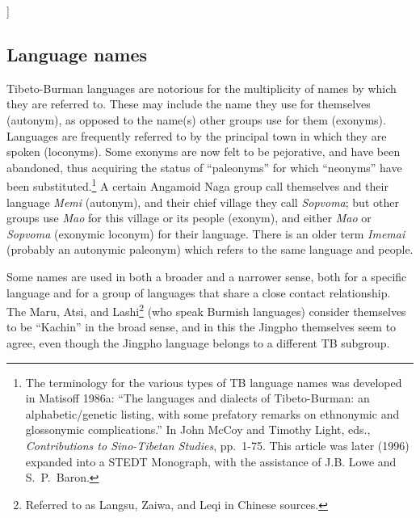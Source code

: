 \begin{itemize}
[[INSERT JAM PROSE]]

\subsection{Language names}


Tibeto-Burman languages are notorious for the multiplicity of names by which
they are referred to. These may include the name they use for themselves
(autonym), as opposed to the name(s) other groups use for them (exonyms). 
Languages are frequently referred to by the principal town in which they are
spoken (loconyms).  Some exonyms are now felt to be pejorative, and have been
abandoned, thus acquiring the status of “paleonyms” for which “neonyms” have
been substituted.\footnote{The terminology for the various types of TB language
names was developed in Matisoff 1986a: “The languages and dialects of
Tibeto-Burman: an alphabetic/genetic listing, with some prefatory remarks on
ethnonymic and glossonymic complications.”  In John McCoy and Timothy Light,
eds., \textit{Contributions to Sino-Tibetan Studies},  pp.~1-75.  This article was later
(1996) expanded into a STEDT Monograph, with the assistance of J.B. Lowe and
S.\ P.\ Baron.}  A certain Angamoid Naga group call themselves and their language
\textit{Memi} (autonym), and their chief village they call \textit{Sopvoma};
but other groups use
\textit{Mao} for this village or its people (exonym), and either \textit{Mao}
or \textit{Sopvoma} (exonymic
loconym) for their language.  There is an older term \textit{Imemai} (probably an
autonymic paleonym) which refers to the same language and people.


Some names are used in both a broader and a narrower sense, both for a
specific language and for a group of languages that share a close contact
relationship.  The Maru, Atsi, and Lashi\footnote{Referred to as Langsu, Zaiwa,
and Leqi in Chinese sources.} (who speak Burmish languages) consider themselves
to be “Kachin” in the broad sense, and in this the Jingpho themselves seem to
agree, even though the Jingpho language belongs to a different TB subgroup.



\end{itemize}
